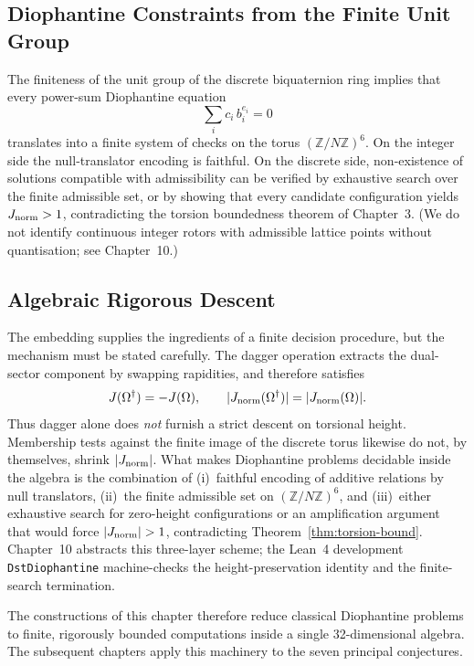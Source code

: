 \documentclass[dvipdfmx,a4paper]{article}
\theoremstyle{definition}
\theoremstyle{remark}
\newcommand{\Jnorm}{J_{\rm norm}}
\begin{document}
\subsection{Diophantine Constraints from the Finite Unit Group}

The finiteness of the unit group of the discrete biquaternion ring implies that every power-sum Diophantine equation
\[
\sum_i c_i\, b_i^{e_i} = 0
\]
translates into a finite system of checks on the torus \( (\mathbb{Z}/N\mathbb{Z})^6 \). On the integer side the null-translator encoding is faithful. On the discrete side, non-existence of solutions compatible with admissibility can be verified by exhaustive search over the finite admissible set, or by showing that every candidate configuration yields \( \Jnorm > 1 \), contradicting the torsion boundedness theorem of Chapter~3. (We do not identify continuous integer rotors with admissible lattice points without quantisation; see Chapter~10.)


\subsection{Algebraic Rigorous Descent}

\label{sec:ch4-descent}
The embedding supplies the ingredients of a finite decision procedure, but the mechanism must be stated carefully. The dagger operation extracts the dual-sector component by swapping rapidities, and therefore satisfies
\[
J(\Omega^\dagger)=-J(\Omega),\qquad |\Jnorm(\Omega^\dagger)|=|\Jnorm(\Omega)|.
\]
Thus dagger alone does \emph{not} furnish a strict descent on torsional height. Membership tests against the finite image of the discrete torus likewise do not, by themselves, shrink \(|\Jnorm|\). What makes Diophantine problems decidable inside the algebra is the combination of (i)~faithful encoding of additive relations by null translators, (ii)~the finite admissible set on \((\mathbb{Z}/N\mathbb{Z})^6\), and (iii)~either exhaustive search for zero-height configurations or an amplification argument that would force \(|\Jnorm|>1\), contradicting Theorem~\ref{thm:torsion-bound}. Chapter~10 abstracts this three-layer scheme; the Lean~4 development \texttt{DstDiophantine} machine-checks the height-preservation identity and the finite-search termination.

The constructions of this chapter therefore reduce classical Diophantine problems to finite, rigorously bounded computations inside a single 32-dimensional algebra. The subsequent chapters apply this machinery to the seven principal conjectures.
\end{document}
